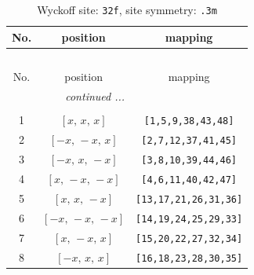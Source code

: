 \documentclass[fleqn,8pt]{jsarticle}
\begin{document}
\begin{longtable}{ccc}
\caption{Wyckoff site: {\tt 32f}, site symmetry: {\tt .3m}}
 \\
 \hline \hline
No. & position & mapping \\ \hline \endfirsthead

\multicolumn{2}{l}{\tablename\ \thetable{}} \\
 \hline \hline
No. & position & mapping \\ \hline \endhead

 \hline \hline
\multicolumn{2}{r}{\footnotesize\it continued ...} \\ \endfoot

 \hline \hline
\multicolumn{2}{r}{} \\ \endlastfoot

1 & $\left[ x,\, x,\, x \right]$ & {\tt [1,5,9,38,43,48]} \\ \hline
2 & $\left[ - x,\, - x,\, x \right]$ & {\tt [2,7,12,37,41,45]} \\ \hline
3 & $\left[ - x,\, x,\, - x \right]$ & {\tt [3,8,10,39,44,46]} \\ \hline
4 & $\left[ x,\, - x,\, - x \right]$ & {\tt [4,6,11,40,42,47]} \\ \hline
5 & $\left[ x,\, x,\, - x \right]$ & {\tt [13,17,21,26,31,36]} \\ \hline
6 & $\left[ - x,\, - x,\, - x \right]$ & {\tt [14,19,24,25,29,33]} \\ \hline
7 & $\left[ x,\, - x,\, x \right]$ & {\tt [15,20,22,27,32,34]} \\ \hline
8 & $\left[ - x,\, x,\, x \right]$ & {\tt [16,18,23,28,30,35]} \\
\end{longtable}
\renewcommand{\arraystretch}{1.2}
\end{document}
